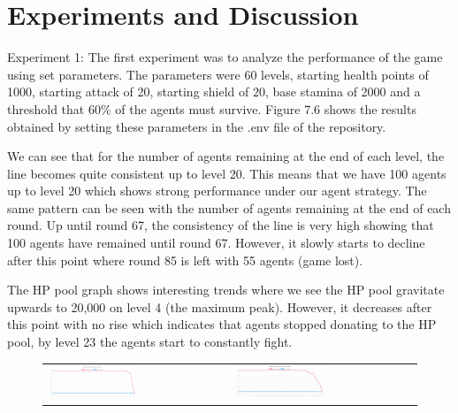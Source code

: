 \section{Experiments and Discussion}


Experiment 1:
The first experiment was to analyze the performance of the game using set parameters. The parameters were 60 levels, starting health points of 1000, starting attack of 20, starting shield of 20, base stamina of 2000 and a threshold that 60\% of the agents must survive.
Figure 7.6 shows the results obtained by setting these parameters in the .env file of the repository. 

We can see that for the number of agents remaining at the end of each level, the line becomes quite consistent up to level 20. This means that we have 100 agents up to level 20 which shows strong performance under our agent strategy. The same pattern can be seen with the number of agents remaining at the end of each round. Up until round 67, the consistency of the line is very high showing that 100 agents have remained until round 67. However, it slowly starts to decline after this point where round 85 is left with 55 agents (game lost). 

The HP pool graph shows interesting trends where we see the HP pool gravitate upwards to 20,000 on level 4 (the maximum peak). However, it decreases after this point with no rise which indicates that agents stopped donating to the HP pool, by level 23 the agents start to constantly fight.

\newpage
\begin{figure}[htbp]
\begin{tabular}{ll}
    \centering
    \includegraphics[width=0.5\textwidth]{007_team_4_agent_design/figures/EX1_1.jpg}
    &
    \includegraphics[width=0.5\textwidth]{007_team_4_agent_design/figures/EX1_2.jpg}
\end{tabular}

\end{figure}

